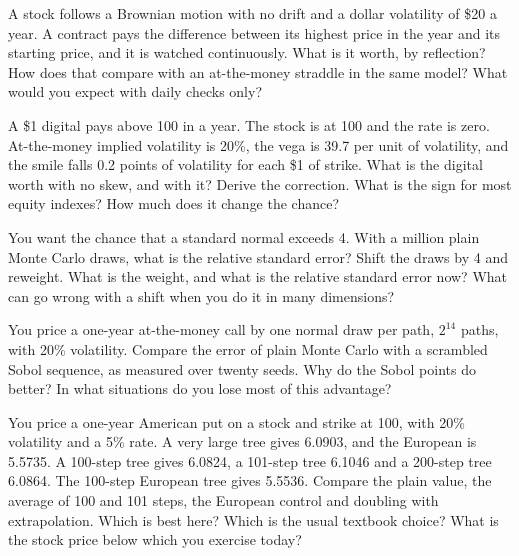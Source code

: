 \begin{question}\label{iq:iv2:pricing-and-numerics:41}
A stock follows a Brownian motion with no drift and a dollar volatility of \$20 a year. A contract pays the difference between its highest price in the year and its starting price, and it is watched continuously. What is it worth, by reflection? How does that compare with an at-the-money straddle in the same model? What would you expect with daily checks only?
\end{question}

\begin{question}\label{iq:iv2:pricing-and-numerics:42}
A \$1 digital pays above 100 in a year. The stock is at 100 and the rate is zero. At-the-money implied volatility is 20\%, the vega is 39.7 per unit of volatility, and the smile falls 0.2 points of volatility for each \$1 of strike. What is the digital worth with no skew, and with it? Derive the correction. What is the sign for most equity indexes? How much does it change the chance?
\end{question}

\begin{question}\label{iq:iv2:pricing-and-numerics:43}
You want the chance that a standard normal exceeds 4. With a million plain Monte Carlo draws, what is the relative standard error? Shift the draws by 4 and reweight. What is the weight, and what is the relative standard error now? What can go wrong with a shift when you do it in many dimensions?
\end{question}

\begin{question}\label{iq:iv2:pricing-and-numerics:44}
You price a one-year at-the-money call by one normal draw per path, $2^{14}$ paths, with 20\% volatility. Compare the error of plain Monte Carlo with a scrambled Sobol sequence, as measured over twenty seeds. Why do the Sobol points do better? In what situations do you lose most of this advantage?
\end{question}

\begin{question}\label{iq:iv2:pricing-and-numerics:45}
You price a one-year American put on a stock and strike at 100, with 20\% volatility and a 5\% rate. A very large tree gives 6.0903, and the European is 5.5735. A 100-step tree gives 6.0824, a 101-step tree 6.1046 and a 200-step tree 6.0864. The 100-step European tree gives 5.5536. Compare the plain value, the average of 100 and 101 steps, the European control and doubling with extrapolation. Which is best here? Which is the usual textbook choice? What is the stock price below which you exercise today?
\end{question}

